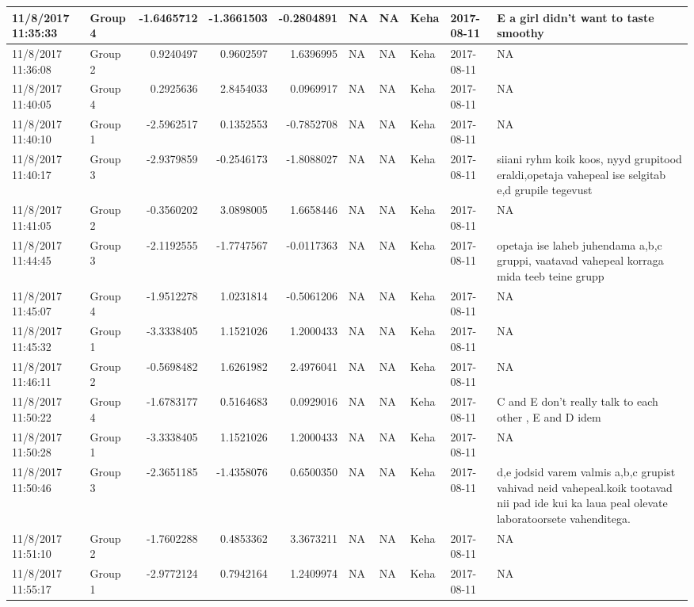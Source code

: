 \documentclass[]{article}
\begin{document}
\begin{tabular}{l|l|r|r|r|l|l|l|l|l}
\hline
11/8/2017 11:35:33 & Group 4 & -1.6465712 & -1.3661503 & -0.2804891 & NA & NA & Keha & 2017-08-11 & E a girl didn't want to taste smoothy\\
\hline
11/8/2017 11:36:08 & Group 2 & 0.9240497 & 0.9602597 & 1.6396995 & NA & NA & Keha & 2017-08-11 & NA\\
\hline
11/8/2017 11:40:05 & Group 4 & 0.2925636 & 2.8454033 & 0.0969917 & NA & NA & Keha & 2017-08-11 & NA\\
\hline
11/8/2017 11:40:10 & Group 1 & -2.5962517 & 0.1352553 & -0.7852708 & NA & NA & Keha & 2017-08-11 & NA\\
\hline
11/8/2017 11:40:17 & Group 3 & -2.9379859 & -0.2546173 & -1.8088027 & NA & NA & Keha & 2017-08-11 & siiani ryhm koik koos, nyyd grupitood eraldi,opetaja vahepeal ise selgitab e,d grupile tegevust\\
\hline
11/8/2017 11:41:05 & Group 2 & -0.3560202 & 3.0898005 & 1.6658446 & NA & NA & Keha & 2017-08-11 & NA\\
\hline
11/8/2017 11:44:45 & Group 3 & -2.1192555 & -1.7747567 & -0.0117363 & NA & NA & Keha & 2017-08-11 & opetaja ise laheb juhendama a,b,c gruppi, vaatavad vahepeal korraga mida teeb teine grupp\\
\hline
11/8/2017 11:45:07 & Group 4 & -1.9512278 & 1.0231814 & -0.5061206 & NA & NA & Keha & 2017-08-11 & NA\\
\hline
11/8/2017 11:45:32 & Group 1 & -3.3338405 & 1.1521026 & 1.2000433 & NA & NA & Keha & 2017-08-11 & NA\\
\hline
11/8/2017 11:46:11 & Group 2 & -0.5698482 & 1.6261982 & 2.4976041 & NA & NA & Keha & 2017-08-11 & NA\\
\hline
11/8/2017 11:50:22 & Group 4 & -1.6783177 & 0.5164683 & 0.0929016 & NA & NA & Keha & 2017-08-11 & C and E don't really talk to each other , E and D idem\\
\hline
11/8/2017 11:50:28 & Group 1 & -3.3338405 & 1.1521026 & 1.2000433 & NA & NA & Keha & 2017-08-11 & NA\\
\hline
11/8/2017 11:50:46 & Group 3 & -2.3651185 & -1.4358076 & 0.6500350 & NA & NA & Keha & 2017-08-11 & d,e jodsid varem valmis a,b,c grupist vahivad neid vahepeal.koik tootavad nii pad ide kui ka laua peal olevate laboratoorsete vahenditega.\\
\hline
11/8/2017 11:51:10 & Group 2 & -1.7602288 & 0.4853362 & 3.3673211 & NA & NA & Keha & 2017-08-11 & NA\\
\hline
11/8/2017 11:55:17 & Group 1 & -2.9772124 & 0.7942164 & 1.2409974 & NA & NA & Keha & 2017-08-11 & NA\\

\end{tabular}
\end{document}
